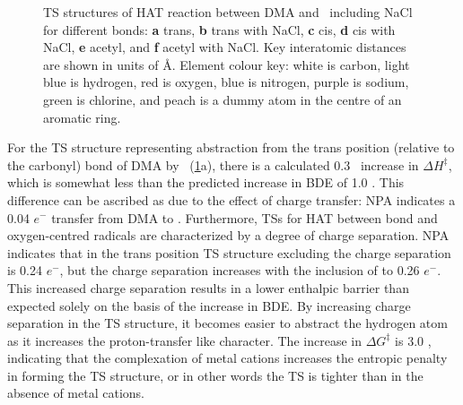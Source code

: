 \begin{figure}

  \caption[TS structures of HAT reaction between DMA and \cumo\ including and excluding NaCl.]{TS structures of HAT reaction between DMA and \cumo\ including NaCl for different  bonds: \textbf{a} trans, \textbf{b} trans with NaCl, \textbf{c} cis, \textbf{d} cis with NaCl, \textbf{e} acetyl, and \textbf{f} acetyl with NaCl. Key interatomic distances are shown in units of \AA. Element colour key: white is carbon, light blue is hydrogen, red is oxygen, blue is nitrogen, purple is sodium, green is chlorine, and peach is a dummy atom in the centre of an aromatic ring.}
  \label{fig:dma-cumo-ts}
\end{figure}

For the TS structure representing abstraction from the trans position (relative to the carbonyl)  bond of DMA by \cumo\ (\ref{fig:dma-cumo-ts}a), there is a calculated 0.3 \kcalmol\ increase in $\Delta H^\ddagger$, which is somewhat less than the predicted increase in BDE of 1.0 \kcalmol. This difference can be ascribed as due to the effect of charge transfer: NPA indicates a 0.04 $e^-$ transfer from DMA to . Furthermore, TSs for HAT between  bond and oxygen-centred radicals are characterized by a degree of charge separation.\cite{Roberts1999} NPA indicates that in the trans position TS structure excluding  the charge separation is 0.24 $e^-$, but the charge separation increases with the inclusion of  to 0.26 $e^-$. This increased charge separation results in a lower enthalpic barrier than expected solely on the basis of the increase in  BDE. By increasing charge separation in the TS structure, it becomes easier to abstract the hydrogen atom as it increases the proton-transfer like character. The increase in $\Delta G^\ddagger$ is 3.0 \kcalmol, indicating that the complexation of metal cations increases the entropic penalty in forming the TS structure, or in other words the TS is tighter than in the absence of metal cations.

